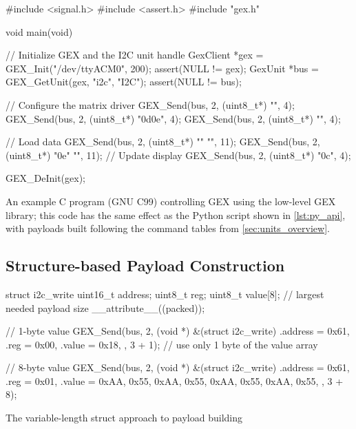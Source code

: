 \begin{listing}
	\begin{ccode}
	#include <signal.h>
	#include <assert.h>
	#include "gex.h"
			
	void main(void)
	{
	    // Initialize GEX and the I2C unit handle
	    GexClient *gex = GEX_Init("/dev/ttyACM0", 200);
	    assert(NULL != gex);        
	    GexUnit *bus = GEX_GetUnit(gex, "i2c", "I2C");
	    assert(NULL != bus);
	    	    
	    // Configure the matrix driver
	    GEX_Send(bus, 2, (uint8_t*) "\x00", 4);
	    GEX_Send(bus, 2, (uint8_t*) "\x0d\x0e", 4);
	    GEX_Send(bus, 2, (uint8_t*) "", 4);
	    
	    // Load data
	    GEX_Send(bus, 2, (uint8_t*) ""
	                                "\xAA{}\xAA{}\xAA{}\xAA{}", 11);
	    GEX_Send(bus, 2, (uint8_t*) "\x0e"
	                                "\xFF{}\xFF{}\xFF{}\xFF{}", 11);
	    // Update display
	    GEX_Send(bus, 2, (uint8_t*) "\x0c", 4);
	    	    
	    GEX_DeInit(gex);
	}    
	\end{ccode}
	\caption{\label{lst:c_api_full} An example C program (GNU C99) controlling GEX using the low-level GEX library; this code has the same effect as the Python script shown in \cref{lst:py_api}, with payloads built following the command tables from \cref{sec:units_overview}.}
\end{listing}

\subsection{Structure-based Payload Construction}

\begin{listing}
	\begin{ccode}
		struct i2c_write {
			uint16_t address;
			uint8_t reg;
			uint8_t value[8]; // largest needed payload size
		} __attribute__((packed));
		
		// 1-byte value
		GEX_Send(bus, 2, (void *) &(struct i2c_write) {
			.address = 0x61,
			.reg = 0x00,
			.value = {0x18},
		}, 3 + 1); // use only 1 byte of the value array
		
		// 8-byte value
		GEX_Send(bus, 2, (void *) &(struct i2c_write) {
			.address = 0x61,
			.reg = 0x01,
			.value = {0xAA, 0x55, 0xAA, 0x55, 0xAA, 0x55, 0xAA, 0x55},
		}, 3 + 8);
	\end{ccode}
	\caption{\label{lst:c_api_struct} The variable-length struct approach to payload building}
\end{listing}

